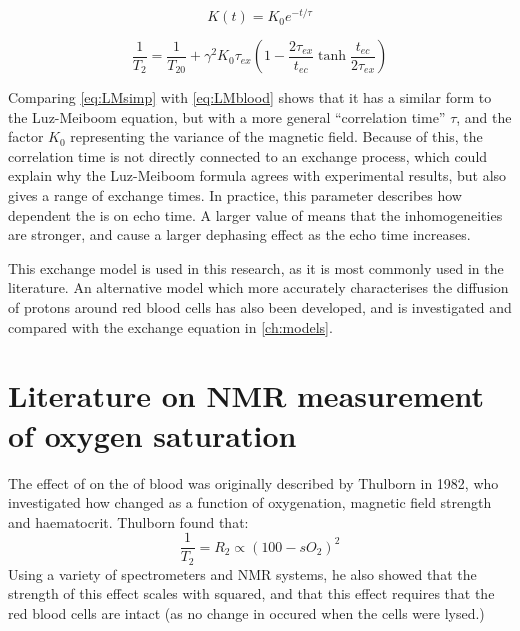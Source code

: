 \begin{equation}
K(t) = K_0 e^{-t/\tau}
\label{eq:JCExpCorr}
\end{equation}

\begin{equation}
\label{eq:LMsimp}
\frac{1}{T_2} = \frac{1}{T_{20}} + \gamma^2 K_0 \tau_{ex} (1 - \frac{2\tau_{ex}}{t_{ec}} \tanh{\frac{t_{ec}}{2\tau_{ex}}})
\end{equation}

Comparing \autoref{eq:LMsimp} with \autoref{eq:LMblood} shows that it has a similar form to the Luz-Meiboom equation, but with a more general ``correlation time'' $\tau$, and the factor $K_0$ representing the variance of the magnetic field.
Because of this, the correlation time is not directly connected to an exchange process, which could explain why the Luz-Meiboom formula agrees with experimental results, but also gives a range of exchange times.
In practice, this \Kzero parameter describes how dependent the \Ttwo is on echo time.
A larger value of \Kzero means that the inhomogeneities are stronger, and cause a larger dephasing effect as the echo time increases.

This exchange model is used in this research, as it is most commonly used in the literature.
An alternative model which more accurately characterises the diffusion of protons around red blood cells has also been developed\cite{JensenNMRrelaxationtissues2000}, and is investigated and compared with the exchange equation in \autoref{ch:models}.

\section{Literature on NMR measurement of oxygen saturation}
The effect of \SOtwo on the \Ttwo of blood was originally described by Thulborn in 1982, who investigated how \Ttwo changed as a function of oxygenation, magnetic field strength and haematocrit\cite{ThulbornOxygenationdependencetransverse1982}.
Thulborn found that:
\begin{displaymath}
\frac{1}{T_2} = R_2 \propto (\mathit{100}-\mathit{sO_2})^2
\end{displaymath}
Using a variety of spectrometers and NMR systems, he also showed that the strength of this effect scales with \Bzero squared, and that this effect requires that the red blood cells are intact (as no change in \Ttwo occured when the cells were lysed.)


